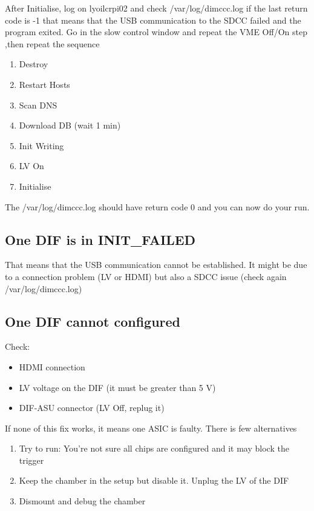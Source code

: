\documentclass[english]{article}
\begin{document}
After Initialise, log on lyoilcrpi02 and check /var/log/dimccc.log if the last return code is -1 that means that the USB communication to the SDCC failed and the program exited. Go in the slow control window and repeat the VME Off/On step ,then repeat the sequence

\begin{enumerate}
\item Destroy
\item Restart Hosts
\item Scan DNS
\item Download DB (wait 1 min)
\item Init Writing
\item LV On
\item Initialise
\end{enumerate}

The /var/log/dimccc.log should have return code 0 and you can now do your run.

\subsection{One DIF is in INIT\_FAILED}

That means that the USB communication cannot be established. It might be due to a connection problem (LV or HDMI) but also a SDCC issue (check again /var/log/dimccc.log)

\subsection{ One DIF cannot configured}

Check:
\begin{itemize}
\item HDMI connection
\item LV voltage on the DIF (it must be greater than 5 V)
\item DIF-ASU connector (LV Off, replug it)
\end{itemize}

If none of this fix works, it means one ASIC is faulty. There is few alternatives
\begin{enumerate}
\item Try to run: You're not sure all chips are configured and it may block the trigger
\item Keep the chamber in the setup but disable it. Unplug the LV of the DIF
\item Dismount and debug the chamber
\end{enumerate}

 
\end{document}
